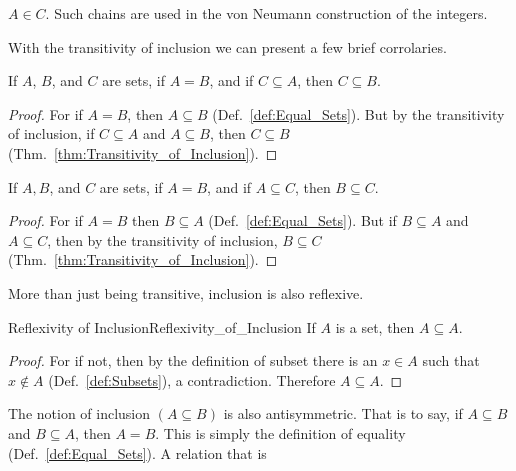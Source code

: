         $A\in{C}$. Such chains are used in the von Neumann construction of the
        integers.
        \par\hfill\par
        With the transitivity of inclusion we can present a few brief
        corrolaries.
        \begin{theorem}
            \label{thm:Subsets_of_Equal_Sets}%
            If $A$, $B$, and $C$ are sets, if $A=B$, and if $C\subseteq{A}$,
            then $C\subseteq{B}$.
        \end{theorem}
        \begin{proof}
            For if $A=B$, then $A\subseteq{B}$ (Def.~\ref{def:Equal_Sets}). But
            by the transitivity of inclusion, if $C\subseteq{A}$ and
            $A\subseteq{B}$, then $C\subseteq{B}$
            (Thm.~\ref{thm:Transitivity_of_Inclusion}).
        \end{proof}
        \begin{theorem}
            \label{thm:Superset_of_Equal_Sets}%
            If $A,B$, and $C$ are sets, if $A=B$, and if $A\subseteq{C}$, then
            $B\subseteq{C}$.
        \end{theorem}
        \begin{proof}
            For if $A=B$ then $B\subseteq{A}$ (Def.~\ref{def:Equal_Sets}).
            But if $B\subseteq{A}$ and $A\subseteq{C}$, then by the transitivity
            of inclusion, $B\subseteq{C}$
            (Thm.~\ref{thm:Transitivity_of_Inclusion}).
        \end{proof}
        More than just being transitive, inclusion is also reflexive.
        \begin{ltheorem}{Reflexivity of Inclusion}{Reflexivity_of_Inclusion}
            If $A$ is a set, then $A\subseteq{A}$.
        \end{ltheorem}
        \begin{proof}
            For if not, then by the definition of subset there is an $x\in{A}$
            such that $x\notin{A}$ (Def.~\ref{def:Subsets}), a contradiction.
            Therefore $A\subseteq{A}$.
        \end{proof}
        The notion of inclusion $(A\subseteq{B})$ is also
        antisymmetric. That is to say, if
        $A\subseteq{B}$ and $B\subseteq{A}$, then $A=B$. This is simply the
        definition of equality (Def.~\ref{def:Equal_Sets}). A relation that is

